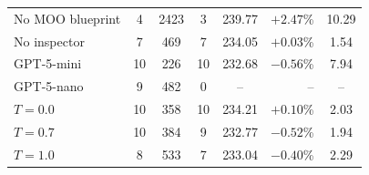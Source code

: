 \documentclass[a4paper,fleqn]{cas-sc}
\begin{document}
\begin{table}[]
\begin{tabular}{@{}l c c c c r c@{}}
  No MOO blueprint      & 4  & 2423  & 3  & 239.77 & $+2.47$\%   & 10.29 \\                                                                 
  No inspector          & 7  & 469   & 7  & 234.05 & $+0.03$\%   & 1.54 \\                                                                  
  GPT-5-mini            & 10 & 226   & 10 & 232.68 & $-0.56$\%   & 7.94 \\                                                                  
  GPT-5-nano            & 9  & 482   & 0  & --     & --          & --   \\                                                                  
  $T=0.0$               & 10 & 358   & 10 & 234.21 & $+0.10$\%   & 2.03 \\                                                                  
  $T=0.7$               & 10 & 384   & 9  & 232.77 & $-0.52$\%   & 1.94 \\                                                                  
  $T=1.0$               & 8  & 533   & 7  & 233.04 & $-0.40$\%   & 2.29 \\                                                                  
  \bottomrule                                                                                                                               
  \end{tabular}                                                                                                                             
  \end{table}                                                                                                                               
                                                                                                                                            
\end{document}
